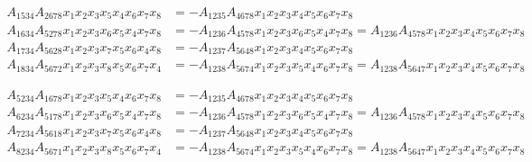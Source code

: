 \documentclass[aps, preprint]{revtex4}
\begin{document}
\begin{enumerate}
\begin{align}A_{1 5 3 4} A_{2 6 7 8} x_{1} x_{2} x_{3} x_{5} x_{4} x_{6} x_{7} x_{8} &  = -A_{1 2 3 5} A_{4 6 7 8} x_{1} x_{2} x_{3} x_{4} x_{5} x_{6} x_{7} x_{8} \\
A_{1 6 3 4} A_{5 2 7 8} x_{1} x_{2} x_{3} x_{6} x_{5} x_{4} x_{7} x_{8} &  = -A_{1 2 3 6} A_{4 5 7 8} x_{1} x_{2} x_{3} x_{6} x_{5} x_{4} x_{7} x_{8} =A_{1 2 3 6} A_{4 5 7 8} x_{1} x_{2} x_{3} x_{4} x_{5} x_{6} x_{7} x_{8} \\
A_{1 7 3 4} A_{5 6 2 8} x_{1} x_{2} x_{3} x_{7} x_{5} x_{6} x_{4} x_{8} &  = -A_{1 2 3 7} A_{5 6 4 8} x_{1} x_{2} x_{3} x_{4} x_{5} x_{6} x_{7} x_{8} \\
A_{1 8 3 4} A_{5 6 7 2} x_{1} x_{2} x_{3} x_{8} x_{5} x_{6} x_{7} x_{4} &  = -A_{1 2 3 8} A_{5 6 7 4} x_{1} x_{2} x_{3} x_{5} x_{4} x_{6} x_{7} x_{8} =A_{1 2 3 8} A_{5 6 4 7} x_{1} x_{2} x_{3} x_{4} x_{5} x_{6} x_{7} x_{8}\end{align}


\begin{align}A_{5 2 3 4} A_{1 6 7 8} x_{1} x_{2} x_{3} x_{5} x_{4} x_{6} x_{7} x_{8} &  = -A_{1 2 3 5} A_{4 6 7 8} x_{1} x_{2} x_{3} x_{4} x_{5} x_{6} x_{7} x_{8} \\
A_{6 2 3 4} A_{5 1 7 8} x_{1} x_{2} x_{3} x_{6} x_{5} x_{4} x_{7} x_{8} &  = -A_{1 2 3 6} A_{4 5 7 8} x_{1} x_{2} x_{3} x_{6} x_{5} x_{4} x_{7} x_{8} =A_{1 2 3 6} A_{4 5 7 8} x_{1} x_{2} x_{3} x_{4} x_{5} x_{6} x_{7} x_{8} \\
A_{7 2 3 4} A_{5 6 1 8} x_{1} x_{2} x_{3} x_{7} x_{5} x_{6} x_{4} x_{8} &  = -A_{1 2 3 7} A_{5 6 4 8} x_{1} x_{2} x_{3} x_{4} x_{5} x_{6} x_{7} x_{8} \\
A_{8 2 3 4} A_{5 6 7 1} x_{1} x_{2} x_{3} x_{8} x_{5} x_{6} x_{7} x_{4} &  = -A_{1 2 3 8} A_{5 6 7 4} x_{1} x_{2} x_{3} x_{5} x_{4} x_{6} x_{7} x_{8} =A_{1 2 3 8} A_{5 6 4 7} x_{1} x_{2} x_{3} x_{4} x_{5} x_{6} x_{7} x_{8}\end{align}


\end{enumerate}
\end{document}
